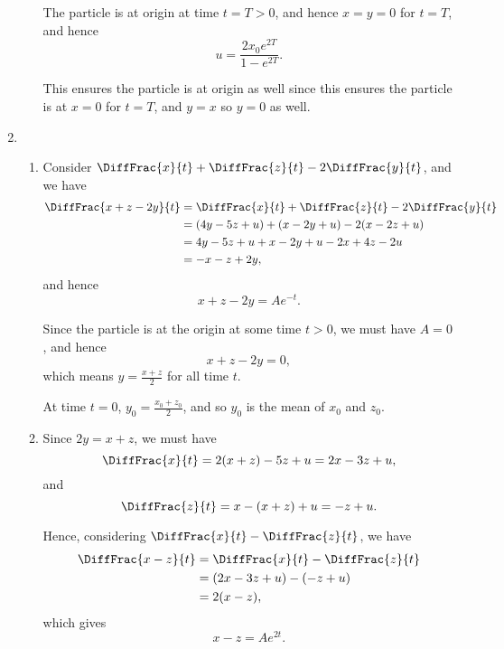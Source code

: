\begin{enumerate}
\begin{enumerate}
                    The particle is at origin at time \(t = T > 0\), and hence \(x = y = 0\) for \(t = T\), and hence
                    \[
                        u = \frac{2 x_0 e^{2T}}{1 - e^{2T}}.
                    \]

                    This ensures the particle is at origin as well since this ensures the particle is at \(x = 0\) for \(t = T\), and \(y = x\) so \(y = 0\) as well.
          \end{enumerate}

    \item \begin{enumerate}
              \item Consider \(\DiffFrac{x}{t} + \DiffFrac{z}{t} - 2 \DiffFrac{y}{t}\), and we have
                    \begin{align*}
                        \DiffFrac{x + z - 2y}{t} & = \DiffFrac{x}{t} + \DiffFrac{z}{t} - 2 \DiffFrac{y}{t} \\
                                                 & = (4y - 5z + u) + (x - 2y + u) - 2 (x - 2z + u)         \\
                                                 & = 4y - 5z + u + x - 2y + u - 2x + 4z - 2u               \\
                                                 & = -x - z + 2y,
                    \end{align*}
                    and hence
                    \[
                        x + z - 2y = A e^{-t}.
                    \]

                    Since the particle is at the origin at some time \(t > 0\), we must have \(A = 0\), and hence
                    \[
                        x + z - 2y = 0,
                    \]
                    which means \(y = \frac{x + z}{2}\) for all time \(t\).

                    At time \(t = 0\), \(y_0 = \frac{x_0 + z_0}{2}\), and so \(y_0\) is the mean of \(x_0\) and \(z_0\).

              \item Since \(2y = x + z\), we must have
                    \[
                        \DiffFrac{x}{t} = 2 (x + z) - 5z + u = 2x - 3z + u,
                    \]
                    and
                    \[
                        \DiffFrac{z}{t} = x - (x + z) + u = -z + u.
                    \]

                    Hence, considering \(\DiffFrac{x}{t} - \DiffFrac{z}{t}\), we have
                    \begin{align*}
                        \DiffFrac{x - z}{t} & = \DiffFrac{x}{t} - \DiffFrac{z}{t} \\
                                            & = (2x - 3z + u) - (-z + u)          \\
                                            & = 2 (x - z),
                    \end{align*}
                    which gives
                    \[
                        x - z = A e^{2t}.
                    \]


\end{enumerate}
\end{enumerate}
